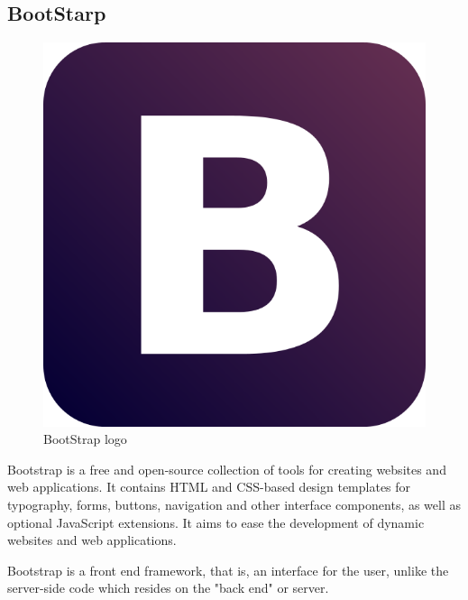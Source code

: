 \subsection{BootStarp} 
\begin{figure}[h]
\centering \includegraphics[scale=0.2]{images/boot.png}
\caption{BootStrap logo}
\end{figure}

Bootstrap is a free and open-source collection of tools for creating websites and web applications. It contains HTML and CSS-based design templates for typography, forms, buttons, navigation and other interface components, as well as optional JavaScript extensions. It aims to ease the development of dynamic websites and web applications.

Bootstrap is a front end framework, that is, an interface for the user, unlike the server-side code which resides on the "back end" or server.


